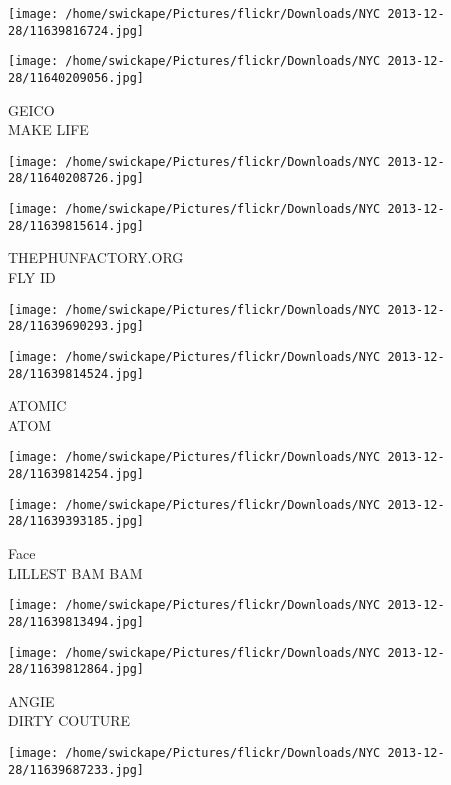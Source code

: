 \documentclass[10pt,letterpaper]{article}
\begin{document}
\texttt{[image: /home/swickape/Pictures/flickr/Downloads/NYC 2013-12-28/11639816724.jpg]}

\vspace{0.25in}
\texttt{[image: /home/swickape/Pictures/flickr/Downloads/NYC 2013-12-28/11640209056.jpg]}

GEICO\\
MAKE LIFE\\
\pagebreak

\texttt{[image: /home/swickape/Pictures/flickr/Downloads/NYC 2013-12-28/11640208726.jpg]}

\vspace{0.25in}
\texttt{[image: /home/swickape/Pictures/flickr/Downloads/NYC 2013-12-28/11639815614.jpg]}

THEPHUNFACTORY.ORG\\
FLY ID\\
\pagebreak

\texttt{[image: /home/swickape/Pictures/flickr/Downloads/NYC 2013-12-28/11639690293.jpg]}

\vspace{0.25in}
\texttt{[image: /home/swickape/Pictures/flickr/Downloads/NYC 2013-12-28/11639814524.jpg]}

ATOMIC\\
ATOM\\
\pagebreak

\texttt{[image: /home/swickape/Pictures/flickr/Downloads/NYC 2013-12-28/11639814254.jpg]}

\vspace{0.25in}
\texttt{[image: /home/swickape/Pictures/flickr/Downloads/NYC 2013-12-28/11639393185.jpg]}

Face\\
LILLEST BAM BAM\\
\pagebreak

\texttt{[image: /home/swickape/Pictures/flickr/Downloads/NYC 2013-12-28/11639813494.jpg]}

\vspace{0.25in}
\texttt{[image: /home/swickape/Pictures/flickr/Downloads/NYC 2013-12-28/11639812864.jpg]}

ANGIE\\
DIRTY COUTURE\\
\pagebreak

\texttt{[image: /home/swickape/Pictures/flickr/Downloads/NYC 2013-12-28/11639687233.jpg]}
\end{document}
